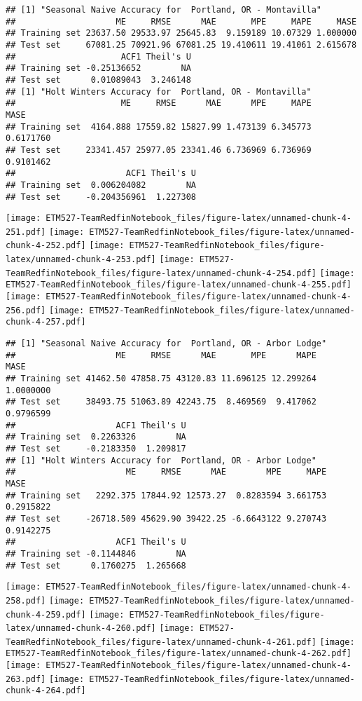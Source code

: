 \documentclass[]{article}
\begin{document}
\begin{verbatim}
## [1] "Seasonal Naive Accuracy for  Portland, OR - Montavilla"
##                    ME     RMSE      MAE       MPE     MAPE     MASE
## Training set 23637.50 29533.97 25645.83  9.159189 10.07329 1.000000
## Test set     67081.25 70921.96 67081.25 19.410611 19.41061 2.615678
##                     ACF1 Theil's U
## Training set -0.25136652        NA
## Test set      0.01089043  3.246148
## [1] "Holt Winters Accuracy for  Portland, OR - Montavilla"
##                     ME     RMSE      MAE      MPE     MAPE      MASE
## Training set  4164.888 17559.82 15827.99 1.473139 6.345773 0.6171760
## Test set     23341.457 25977.05 23341.46 6.736969 6.736969 0.9101462
##                      ACF1 Theil's U
## Training set  0.006204082        NA
## Test set     -0.204356961  1.227308
\end{verbatim}

\texttt{[image: ETM527-TeamRedfinNotebook\_files/figure-latex/unnamed-chunk-4-251.pdf]}
\texttt{[image: ETM527-TeamRedfinNotebook\_files/figure-latex/unnamed-chunk-4-252.pdf]}
\texttt{[image: ETM527-TeamRedfinNotebook\_files/figure-latex/unnamed-chunk-4-253.pdf]}
\texttt{[image: ETM527-TeamRedfinNotebook\_files/figure-latex/unnamed-chunk-4-254.pdf]}
\texttt{[image: ETM527-TeamRedfinNotebook\_files/figure-latex/unnamed-chunk-4-255.pdf]}
\texttt{[image: ETM527-TeamRedfinNotebook\_files/figure-latex/unnamed-chunk-4-256.pdf]}
\texttt{[image: ETM527-TeamRedfinNotebook\_files/figure-latex/unnamed-chunk-4-257.pdf]}

\begin{verbatim}
## [1] "Seasonal Naive Accuracy for  Portland, OR - Arbor Lodge"
##                    ME     RMSE      MAE       MPE      MAPE      MASE
## Training set 41462.50 47858.75 43120.83 11.696125 12.299264 1.0000000
## Test set     38493.75 51063.89 42243.75  8.469569  9.417062 0.9796599
##                    ACF1 Theil's U
## Training set  0.2263326        NA
## Test set     -0.2183350  1.209817
## [1] "Holt Winters Accuracy for  Portland, OR - Arbor Lodge"
##                      ME     RMSE      MAE        MPE     MAPE      MASE
## Training set   2292.375 17844.92 12573.27  0.8283594 3.661753 0.2915822
## Test set     -26718.509 45629.90 39422.25 -6.6643122 9.270743 0.9142275
##                    ACF1 Theil's U
## Training set -0.1144846        NA
## Test set      0.1760275  1.265668
\end{verbatim}

\texttt{[image: ETM527-TeamRedfinNotebook\_files/figure-latex/unnamed-chunk-4-258.pdf]}
\texttt{[image: ETM527-TeamRedfinNotebook\_files/figure-latex/unnamed-chunk-4-259.pdf]}
\texttt{[image: ETM527-TeamRedfinNotebook\_files/figure-latex/unnamed-chunk-4-260.pdf]}
\texttt{[image: ETM527-TeamRedfinNotebook\_files/figure-latex/unnamed-chunk-4-261.pdf]}
\texttt{[image: ETM527-TeamRedfinNotebook\_files/figure-latex/unnamed-chunk-4-262.pdf]}
\texttt{[image: ETM527-TeamRedfinNotebook\_files/figure-latex/unnamed-chunk-4-263.pdf]}
\texttt{[image: ETM527-TeamRedfinNotebook\_files/figure-latex/unnamed-chunk-4-264.pdf]}
\end{document}
